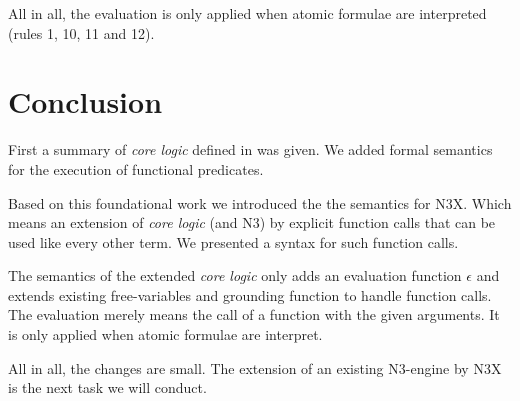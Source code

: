 \documentclass[runningheads]{llncs}
\begin{document}
\noindent All in all, the evaluation is only applied when atomic formulae are interpreted (rules 1, 10, 11 and 12).



\section{Conclusion}
\label{sec:concl}

First a summary of \emph{core logic} defined in \cite{Arndt.2019} was given.
We added formal semantics for the execution of functional predicates.

Based on this foundational work we introduced the the semantics for N3X.
Which means an extension of \emph{core logic} (and N3) by explicit function calls that can be used like every other term.
We presented a syntax for such function calls.

The semantics of the extended \emph{core logic} only adds an evaluation function $\epsilon$ and extends existing free-variables and grounding function to handle function calls.
The evaluation merely means the call of a function with the given arguments.
It is only applied when atomic formulae are interpret.

All in all, the changes are small.
The extension of an existing N3-engine by N3X is the next task we will conduct.





\end{document}
